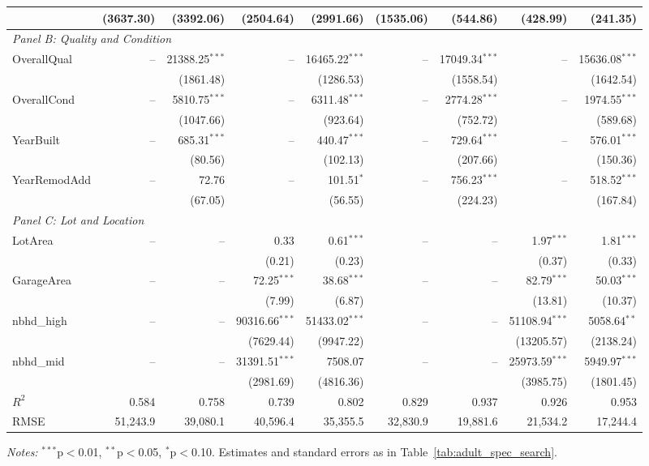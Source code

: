 \documentclass[conference]{IEEEtran}
\begin{document}
\begin{table}[htbp]
{\begin{threeparttable}
\begin{tabular}{lrrrrrrrr}
					& (3637.30) & (3392.06) & (2504.64) & (2991.66) & (1535.06) & (544.86) & (428.99) & (241.35) \\
					\midrule
					\multicolumn{9}{l}{\textit{Panel B: Quality and Condition}} \\
					\quad OverallQual & -- & 21388.25$^{***}$ & -- & 16465.22$^{***}$ & -- & 17049.34$^{***}$ & -- & 15636.08$^{***}$ \\
					&  & (1861.48) &  & (1286.53) &  & (1558.54) &  & (1642.54) \\
					\quad OverallCond & -- & 5810.75$^{***}$ & -- & 6311.48$^{***}$ & -- & 2774.28$^{***}$ & -- & 1974.55$^{***}$ \\
					&  & (1047.66) &  & (923.64) &  & (752.72) &  & (589.68) \\
					\quad YearBuilt & -- & 685.31$^{***}$ & -- & 440.47$^{***}$ & -- & 729.64$^{***}$ & -- & 576.01$^{***}$ \\
					&  & (80.56) &  & (102.13) &  & (207.66) &  & (150.36) \\
					\quad YearRemodAdd & -- & 72.76 & -- & 101.51$^{*}$ & -- & 756.23$^{***}$ & -- & 518.52$^{***}$ \\
					&  & (67.05) &  & (56.55) &  & (224.23) &  & (167.84) \\
					\midrule
					\multicolumn{9}{l}{\textit{Panel C: Lot and Location}} \\
					\quad LotArea & -- & -- & 0.33 & 0.61$^{***}$ & -- & -- & 1.97$^{***}$ & 1.81$^{***}$ \\
					&  &  & (0.21) & (0.23) &  &  & (0.37) & (0.33) \\
					\quad GarageArea & -- & -- & 72.25$^{***}$ & 38.68$^{***}$ & -- & -- & 82.79$^{***}$ & 50.03$^{***}$ \\
					&  &  & (7.99) & (6.87) &  &  & (13.81) & (10.37) \\
					\quad nbhd\_high & -- & -- & 90316.66$^{***}$ & 51433.02$^{***}$ & -- & -- & 51108.94$^{***}$ & 5058.64$^{**}$ \\
					&  &  & (7629.44) & (9947.22) &  &  & (13205.57) & (2138.24) \\
					\quad nbhd\_mid & -- & -- & 31391.51$^{***}$ & 7508.07 & -- & -- & 25973.59$^{***}$ & 5949.97$^{***}$ \\
					&  &  & (2981.69) & (4816.36) &  &  & (3985.75) & (1801.45) \\
					\midrule
					$R^2$ & 0.584 & 0.758 & 0.739 & 0.802 & 0.829 & 0.937 & 0.926 & 0.953 \\
					RMSE & 51,243.9 & 39,080.1 & 40,596.4 & 35,355.5 & 32,830.9 & 19,881.6 & 21,534.2 & 17,244.4 \\
					\bottomrule
					\end{tabular}
					\begin{tablenotes}
					\footnotesize
					\item \textit{Notes:} $^{***}$p$<$0.01, $^{**}$p$<$0.05, $^{*}$p$<$0.10. Estimates and standard errors as in Table~\ref{tab:adult_spec_search}.
					\end{tablenotes}
			\end{threeparttable}
		}%
	\end{table}
	
\end{document}
